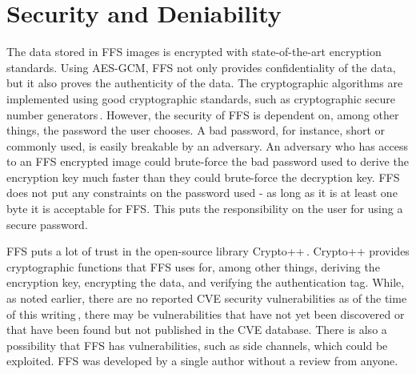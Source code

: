 \section{Security and Deniability}
\label{sec:dis_sec}
The data stored in \gls{FFS} images is encrypted with \mbox{state-of-the-art} encryption standards. Using \mbox{\gls{AES}-\gls{GCM}}, \gls{FFS} not only provides confidentiality of the data, but it also proves the authenticity of the data. The cryptographic algorithms are implemented using good cryptographic standards, such as cryptographic secure number generators\,\cite{RandomNumberGeneratorCryptoWiki2021}. However, the security of \gls{FFS} is dependent on, among other things, the password the user chooses. A bad password, for instance, short or commonly used, is easily breakable by an adversary. An adversary who has access to an \gls{FFS} encrypted image could \mbox{brute-force} the bad password used to derive the encryption key much faster than they could \mbox{brute-force} the decryption key. \gls{FFS} does not put any constraints on the password used - as long as it is at least one byte it is acceptable for \gls{FFS}. This puts the responsibility on the user for using a secure password. 

\gls{FFS} puts a lot of trust in the \mbox{open-source} library Crypto++\,\cite{CryptoLibraryFree}. Crypto++ provides cryptographic functions that \gls{FFS} uses for, among other things, deriving the encryption key, encrypting the data, and verifying the authentication tag. While, as noted earlier, there are no reported CVE security vulnerabilities as of the time of this writing\,\cite{CryptoppSecurityVulnerabilities}, there may be vulnerabilities that have not yet been discovered or that have been found but not published in the CVE database. There is also a possibility that \gls{FFS} has vulnerabilities, such as side channels, which could be exploited. \gls{FFS} was developed by a single author without a review from anyone.

